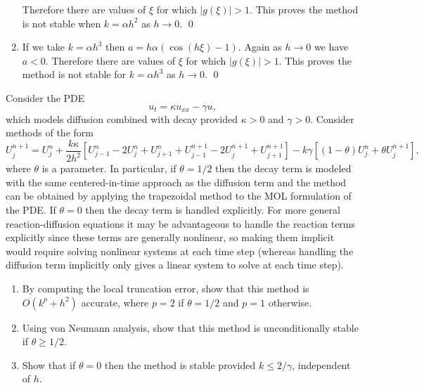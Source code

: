 \documentclass[10pt]{article}
\begin{document}
\begin{solution}[Solution]
\begin{enumerate}[label=(\alph*)]
    Therefore there are values of \( \xi \) for which \( |g(\xi)| > 1 \). This proves the method is not stable when \( k = \alpha h^2 \) as \( h\to 0 \). \qed

    \item
    If we take \( k = \alpha h^3 \) then \( a = h\alpha(\cos(h\xi)-1) \). Again as \( h\to 0 \) we have \( a < 0 \).
    Therefore there are values of \( \xi \) for which \( |g(\xi)| > 1 \). This proves the method is not stable for  \( k = \alpha h^3 \) as \( h\to 0 \). \qed


\end{enumerate}


\end{solution}

\begin{problem}[Problem 2]
Consider the PDE
\[
u_t = \kappa u_{xx} - \gamma u ,
\]
which models diffusion combined with decay provided \(\kappa > 0\) and \(\gamma > 0\).
Consider methods of the form
\[
U_j^{n+1} = U_j^n + \frac{k \kappa}{2 h^2} [ U_{j-1}^n - 2 U_j^n + U_{j+1}^n + U_{j-1}^{n+1} -
2 U_j^{n+1} + U_{j+1}^{n+1} ] - k \gamma [ (1 - \theta ) U_j^n + \theta U_j^{n+1} ] ,
\]
where \(\theta\) is a parameter.  In particular, if \(\theta = 1/2\) then the decay term is modeled with the same centered-in-time approach as the diffusion term and the method can be obtained by applying the trapezoidal method to the MOL formulation of the PDE.  If \(\theta = 0\) then the decay term is handled explicitly.  For more general reaction-diffusion equations it may be advantageous to handle the reaction terms explicitly since these terms are generally nonlinear, so making them implicit would require solving nonlinear systems at each time step (whereas handling the diffusion term implicitly only gives a linear system to solve at each time step).
\begin{enumerate}[label=(\alph*)]
\item
By computing the local truncation error, show that this method is \(O( k^p + h^2 )\) accurate,
where \(p = 2\) if \(\theta = 1/2\) and \(p = 1\) otherwise.
\item
Using von Neumann analysis, show that this method is unconditionally stable if \(\theta \geq 1/2\).
\item
Show that if \(\theta = 0\) then the method is stable provided \(k \leq 2/ \gamma\), independent of \(h\).
\end{enumerate}
\end{problem}
\end{document}
